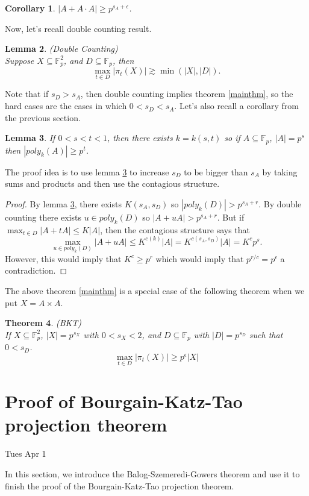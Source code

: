 \documentclass[12pt]{amsart}
\newtheorem{theorem}{Theorem}[section]
\newtheorem{lemma}[theorem]{Lemma}
\newtheorem{corollary}[theorem]{Corollary}
\newcommand{\F}{\mathbb{F}}
\begin{document}
\begin{corollary}
    $|A+A\cdot A|\geq p^{s_A+\epsilon}$. 
\end{corollary}
Now, let's recall double counting result. 
\begin{lemma}(Double Counting)\\
  Suppose $X \subseteq \F_p^2$, and $D \subseteq \F_p$, then 
  $$\max_{t \in D}|\pi_t(X)| \gtrsim \min(|X|,|D|).$$
\end{lemma}
Note that if $s_D >s_A$, then double counting implies theorem \ref{mainthm}, so the hard cases are the cases in which $0<s_D<s_A$.  
Let's also recall a corollary from the previous section. 
\begin{lemma}\label{sumprod}
    If $0<s<t<1$, then there exists $k=k(s,t)$ so if $A \subseteq \F_p$, $|A|=p^s$ then $|poly_k(A)|\geq p^t$. 
\end{lemma}
The proof idea is to use lemma \ref{sumprod} to increase $s_D$ to be bigger than $s_A$ by taking sums and products and then use the contagious structure.  
\begin{proof}
    By lemma \ref{sumprod}, there exists $K(s_A,s_D)$ so $|poly_k(D)|>p^{s_A+r}$. By double counting there exists $u \in poly_k(D)$ so $|A+uA|>p^{s_A+r}$. But if $\max_{t\in D}|A+tA|\leq K|A|$, then the contagious structure says that 
    $$\max_{u \in poly_k(D)}|A+uA|\leq K^{c(k)}|A|=K^{c(s_A,s_D)}|A|=K^cp^s.$$
    However, this would imply that $K^c\geq p^r$ which would imply that $p^{r/c}=p^\epsilon$ a contradiction. 
\end{proof}
The above theorem \ref{mainthm} is a special case of the following theorem when we put $X=A\times A$. 
\begin{theorem}(BKT)\\
If $X \subseteq \F_p^2$, $|X|=p^{s_X}$ with $0<s_X<2$, and $D \subseteq \F_p$ with $|D|=p^{s_D}$ such that $0<s_D$. 
$$\max_{t\in D}|\pi_t(X)|\geq p^\epsilon |X|$$
\end{theorem}

\newpage

\section{Proof of Bourgain-Katz-Tao projection theorem}  \label{lectbktproof}


Tues Apr 1

In this section,  we introduce the Balog-Szemeredi-Gowers theorem and use it to finish the proof of the Bourgain-Katz-Tao projection theorem.
\end{document}
